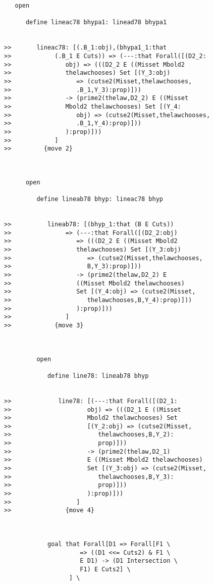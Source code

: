 \documentclass[12pt]{article}
\begin{document}
\begin{verbatim}
   open

      define lineac78 bhypa1: linead78 bhypa1


>>       lineac78: [(.B_1:obj),(bhypa1_1:that
>>            (.B_1 E Cuts)) => (---:that Forall([(D2_2:
>>               obj) => (((D2_2 E ((Misset Mbold2
>>               thelawchooses) Set [(Y_3:obj)
>>                  => (cutse2(Misset,thelawchooses,
>>                  .B_1,Y_3):prop)]))
>>               -> (prime2(thelaw,D2_2) E ((Misset
>>               Mbold2 thelawchooses) Set [(Y_4:
>>                  obj) => (cutse2(Misset,thelawchooses,
>>                  .B_1,Y_4):prop)]))
>>               ):prop)]))
>>            ]
>>         {move 2}



      open

         define lineab78 bhyp: lineac78 bhyp


>>          lineab78: [(bhyp_1:that (B E Cuts))
>>               => (---:that Forall([(D2_2:obj)
>>                  => (((D2_2 E ((Misset Mbold2
>>                  thelawchooses) Set [(Y_3:obj)
>>                     => (cutse2(Misset,thelawchooses,
>>                     B,Y_3):prop)]))
>>                  -> (prime2(thelaw,D2_2) E
>>                  ((Misset Mbold2 thelawchooses)
>>                  Set [(Y_4:obj) => (cutse2(Misset,
>>                     thelawchooses,B,Y_4):prop)]))
>>                  ):prop)]))
>>               ]
>>            {move 3}



         open

            define line78: lineab78 bhyp


>>             line78: [(---:that Forall([(D2_1:
>>                     obj) => (((D2_1 E ((Misset
>>                     Mbold2 thelawchooses) Set
>>                     [(Y_2:obj) => (cutse2(Misset,
>>                        thelawchooses,B,Y_2):
>>                        prop)]))
>>                     -> (prime2(thelaw,D2_1)
>>                     E ((Misset Mbold2 thelawchooses)
>>                     Set [(Y_3:obj) => (cutse2(Misset,
>>                        thelawchooses,B,Y_3):
>>                        prop)]))
>>                     ):prop)]))
>>                  ]
>>               {move 4}



            goal that Forall[D1 => Forall[F1 \
                     => ((D1 <<= Cuts2) & F1 \
                     E D1) -> (D1 Intersection \
                     F1) E Cuts2] \
                  ] \
               




\end{verbatim}
\end{document}
